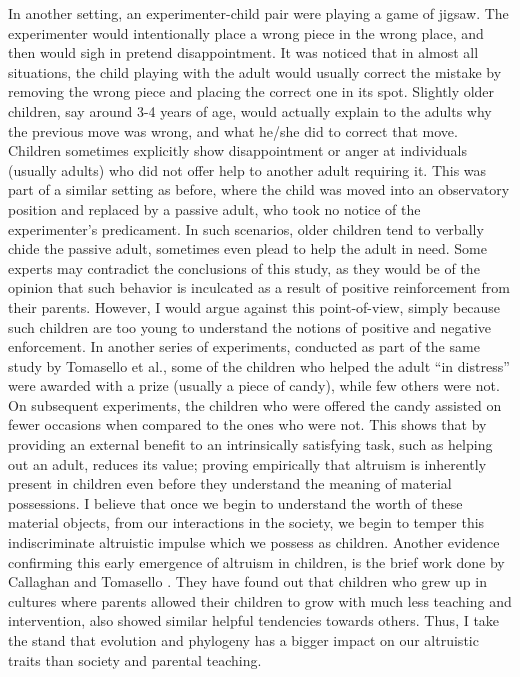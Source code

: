 \documentclass[12pt, letter]{article}
\begin{document}
In another setting, an experimenter-child pair were playing a game of jigsaw. The experimenter would intentionally place a wrong piece in the wrong place, and then would sigh in pretend disappointment. It was noticed that in almost all situations, the child playing with the adult would usually correct the mistake by removing the wrong piece and placing the correct one in its spot. Slightly older children, say around 3-4 years of age, would actually explain to the adults why the previous move was wrong, and what he/she did to correct that move. Children sometimes explicitly show disappointment or anger at individuals (usually adults) who did not offer help to another adult requiring it. This was part of a similar setting as before, where the child was moved into an observatory position and replaced by a passive adult, who took no notice of the experimenter's predicament. In such scenarios, older children tend to verbally chide the passive adult, sometimes even plead to help the adult in need. Some experts may contradict the conclusions of this study, as they would be of the opinion that such behavior is inculcated as a result of positive reinforcement from their parents. However, I would argue against this point-of-view, simply because such children are too young to understand the notions of positive and negative enforcement. In another series of experiments, conducted as part of the same study by Tomasello et al., some of the children who helped the adult ``in distress'' were awarded with a prize (usually a piece of candy), while few others were not. On subsequent experiments, the children who were offered the candy assisted on fewer occasions when compared to the ones who were not. This shows that by providing an external benefit to an intrinsically satisfying task, such as helping out an adult, reduces its value; proving empirically that altruism is inherently present in children even before they understand the meaning of material possessions. I believe that once we begin to understand the worth of these material objects, from our interactions in the society, we begin to temper this indiscriminate altruistic impulse which we possess as children. Another evidence confirming this early emergence of altruism in children, is the brief work done by Callaghan and Tomasello \cite{tomasello2008origins}. They have found out that children who grew up in cultures where parents allowed their children to grow with much less teaching and intervention, also showed similar helpful tendencies towards others. Thus, I take the stand that evolution and phylogeny has a bigger impact on our altruistic traits than society and parental teaching.
\end{document}
